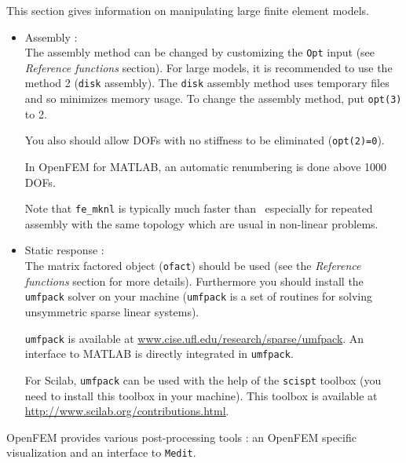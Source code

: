 \newpage
This section gives information on manipulating large finite element models.
\begin{itemize}
\item Assembly : \\
The assembly method can be changed by customizing the {\tt Opt} input (see {\sl Reference functions} section). For large models, it is recommended to use the method 2 ({\tt disk} assembly). The {\tt disk} assembly method uses temporary files and so minimizes memory usage. To change the assembly method, put {\tt opt(3)} to 2.

You also should allow DOFs with no stiffness to be eliminated ({\tt opt(2)=0}).

In OpenFEM for MATLAB, an automatic renumbering is done above 1000 DOFs.

Note that {\tt fe\_mknl} is typically much faster than \femk\ especially for repeated assembly with the same topology which are usual in non-linear problems.

\item Static response :\\
The matrix factored object ({\tt ofact}) should be used (see the {\sl Reference functions} section for more details). Furthermore you should install the {\tt umfpack} solver on your machine ({\tt umfpack} is a set of routines for solving unsymmetric sparse linear systems).

{\tt umfpack} is available at \href{http://www.cise.ufl.edu/research/sparse/umfpack}{www.cise.ufl.edu/research/sparse/umfpack}. An interface to MATLAB is directly integrated in {\tt umfpack}.

 For Scilab, {\tt umfpack} can be used with the help of the {\tt scispt} toolbox (you need to install this toolbox in your machine). This toolbox is available at  \href{http://www.scilab.org/contributions.html}{http://www.scilab.org/contributions.html}.
\end{itemize}


\newpage

OpenFEM provides various post-processing tools : an OpenFEM specific visualization and an interface to {\tt Medit}. 

